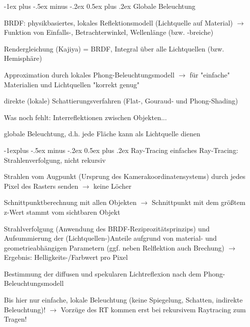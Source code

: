 \documentclass[landscape]{article}
\makeatletter
\renewcommand{\section}{\@startsection{section}{1}{0mm}%
                                {-1ex plus -.5ex minus -.2ex}%
                                {0.5ex plus .2ex}%
                                {\normalfont\large\bfseries}}
\renewcommand{\subsection}{\@startsection{subsection}{2}{0mm}%
                                {-1explus -.5ex minus -.2ex}%
                                {0.5ex plus .2ex}%
                                {\normalfont\normalsize\bfseries}}
\makeatother
\begin{document}
\begin{multicols}{3}
  \section{Globale Beleuchtung}
  \begin{itemize*}
    \item BRDF: physikbasiertes, lokales Reflektionsmodell (Lichtquelle auf Material) $\rightarrow$ Funktion von Einfalls-, Betrachterwinkel, Wellenlänge (bzw. -breiche)
    \item Rendergleichung (Kajiya) = BRDF, Integral über alle Lichtquellen (bzw. Hemisphäre)
    \item Approximation durch lokales Phong-Beleuchtungsmodell $\rightarrow$ für "einfache" Materialien und Lichtquellen "korrekt genug"
    \item direkte (lokale) Schattierungsverfahren (Flat-, Gouraud- und Phong-Shading)
    \item Was noch fehlt: Interreflektionen zwischen Objekten...
    \item globale Beleuchtung, d.h. jede Fläche kann als Lichtquelle dienen
  \end{itemize*}
  
  \subsection{ Ray-Tracing}
  einfaches Ray-Tracing: Strahlenverfolgung, nicht rekursiv
  \begin{itemize*}
    \item Strahlen vom Augpunkt (Ursprung des Kamerakoordinatensystems) durch jedes Pixel des Rasters senden $\rightarrow$ keine Löcher
    \item Schnittpunktberechnung mit allen Objekten $\rightarrow$ Schnittpunkt mit dem größtem z-Wert stammt vom sichtbaren Objekt
    \item Strahlverfolgung (Anwendung des BRDF-Reziprozitätsprinzips) und Aufsummierung der (Lichtquellen-)Anteile aufgrund von material- und geometrieabhängigen Parametern (ggf. neben Relflektion auch Brechung) $\rightarrow$ Ergebnis: Helligkeits-/Farbwert pro Pixel
    \item Bestimmung der diffusen und spekularen Lichtreflexion nach dem Phong-Beleuchtungsmodell
    \item Bis hier nur einfache, lokale Beleuchtung (keine Spiegelung, Schatten, indirekte Beleuchtung)! $\rightarrow$ Vorzüge des RT kommen erst bei rekursivem Raytracing zum Tragen!
  \end{itemize*}
  

\end{multicols}
\end{document}
